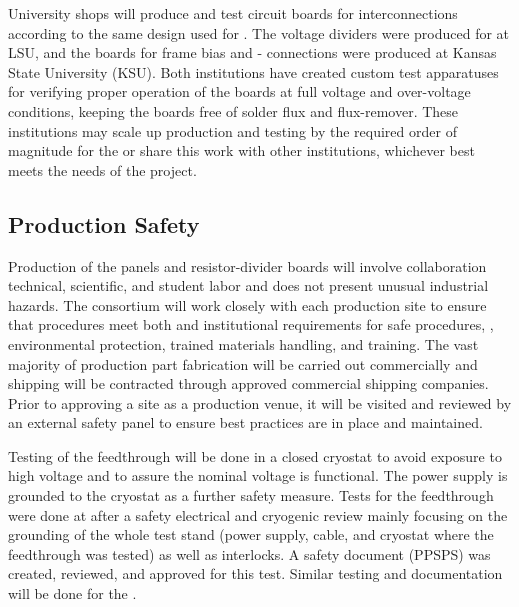 University shops will produce and test circuit boards for %
 interconnections according to the same design used for .  The  voltage dividers were produced for  at LSU, and the boards for  frame bias and - connections were produced at Kansas State University (KSU).
Both institutions have created custom test apparatuses for verifying proper operation of the boards at full voltage and over-voltage conditions, keeping the boards free of solder flux and flux-remover.  These institutions may scale up production and testing by the required order of magnitude for the  or share this work with other institutions, whichever best meets the needs of the project. %

\subsection{Production Safety}
\label{sec:fdsp-hv-prod-safety}

Production of the  panels and resistor-divider boards will involve collaboration technical, scientific, and student labor and  does not present unusual industrial hazards. The  consortium will work closely with each production site to ensure that procedures meet both  and institutional requirements for safe procedures, , environmental protection, trained materials handling, and training. The vast majority of production part fabrication will be carried out commercially and shipping will be contracted through approved commercial shipping companies. Prior to approving a site as a production venue, it will be visited and reviewed by an external safety panel to ensure best practices are in place and maintained. 

Testing of the  feedthrough will be done in a closed cryostat to avoid exposure to high voltage and  to assure the nominal voltage is functional.  The power supply is grounded to the cryostat as a further safety measure. Tests for the   feedthrough were done at  after a safety electrical and cryogenic review mainly focusing on the grounding of the whole test stand (power supply, cable, and cryostat where the feedthrough was tested) as well as interlocks. A safety document (PPSPS) was created, reviewed, and approved for this test. Similar testing and documentation will be done for the .


